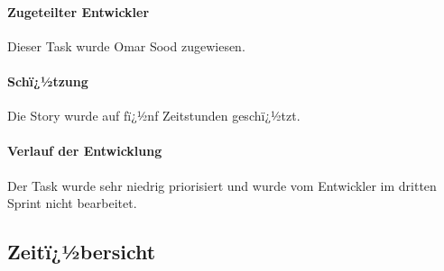 \documentclass[12pt, titlepage]{scrartcl}
\begin{document}
		\paragraph{Zugeteilter Entwickler} Dieser Task wurde Omar Sood zugewiesen.
		\paragraph{Schï¿½tzung}
		Die Story wurde auf fï¿½nf Zeitstunden geschï¿½tzt.
		\paragraph{Verlauf der Entwicklung} 
		Der Task wurde sehr niedrig priorisiert und wurde vom Entwickler im dritten Sprint nicht bearbeitet.
		\newpage
		
		\subsection{Zeitï¿½bersicht}
\end{document}
